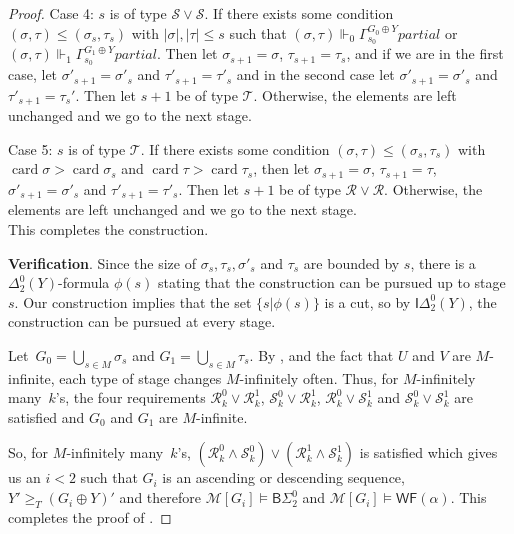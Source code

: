 \documentclass{article}
\newtheorem{theorem}{Theorem}
\numberwithin{theorem}{section}
\newcommand{\RCA}{\mathsf{RCA}}
\newcommand{\SADS}{\mathsf{SADS}}
\newcommand{\BSig}{\mathsf{B}\Sigma^0}
\newcommand{\IDel}{\mathsf{I}\Delta^0}
\newcommand{\WF}{\mathsf{WF}}
\newcommand{\R}{\mathcal{R}}
\renewcommand{\S}{\mathcal{S}}
\newcommand{\M}{\mathcal{M}}
\newcommand{\card}{\operatorname{card}}
\begin{document}
\begin{proof}
Case 4: $s$ is of type $\S \vee \S$. If there exists some condition $(\sigma,\tau) \leq (\sigma_s,\tau_s)$ with $|\sigma|,|\tau| \leq s$ such that $(\sigma,\tau) \Vdash_0\Gamma_{s_0}^{G_0 \oplus Y} partial$ or $(\sigma,\tau) \Vdash_1 \Gamma_{s_0}^{G_1 \oplus Y} partial$. Then let $\sigma_{s+1} = \sigma$, $\tau_{s+1} = \tau_s$, and if we are in the first case, let $\sigma'_{s+1} = \sigma'_s$ and $\tau'_{s+1} = \tau'_s$ and in the second case let $\sigma'_{s+1} = \sigma'_s$ and $\tau'_{s+1} = \tau_s'$. Then let $s+1$ be of type $\mathcal{T}$. Otherwise, the elements are left unchanged and we go to the next stage.

Case 5: $s$ is of type $\mathcal{T}$. If there exists some condition $(\sigma, \tau) \leq (\sigma_s, \tau_s)$ with $\card \sigma > \card \sigma_s$ and $\card \tau > \card \tau_s$, then let $\sigma_{s+1} = \sigma$, $\tau_{s+1} = \tau$, $\sigma'_{s+1} = \sigma'_s$ and $\tau'_{s+1} = \tau'_s$. Then let $s+1$ be of type $\R \vee \R$. Otherwise, the elements are left unchanged and we go to the next stage. \\ 

This completes the construction.
\bigskip

\textbf{Verification}. Since the size of $\sigma_s, \tau_s, \sigma'_s$ and $\tau_s$ are bounded by $s$, there is a $\Delta_2^0(Y)$-formula $\phi(s)$ stating that the construction can be pursued up to stage $s$. Our construction implies that the set $\{s|\phi(s)\}$ is a cut, so by $\IDel_2(Y)$, the construction can be pursued at every stage.

Let~$G_0 = \bigcup_{s \in M} \sigma_s$ and $G_1 = \bigcup_{s \in M} \tau_s$.
By , and the fact that $U$ and $V$ are $M$-infinite, each type of stage changes $M$-infinitely often. Thus, for $M$-infinitely many~$k$'s, the four requirements $\R^0_k \vee \R^1_k$, $\S^0_k \vee \R^1_k$, $\R^0_k \vee \S^1_k$ and $\S^0_k \vee \S^1_k$ are satisfied and $G_0$ and $G_1$ are $M$-infinite. 

So, for $M$-infinitely many~$k$'s, $(\mathcal{R}^0_k \wedge \S^0_k) \vee (\R^1_k \wedge \S^1_k)$ is satisfied which gives us an $i < 2$ such that $G_i$ is an ascending or descending sequence, $Y' \geq_T (G_i \oplus Y)'$ and therefore $\M[G_i] \models \BSig_2$ and $\M[G_i] \models \WF(\alpha)$. This completes the proof of .
\end{proof}

\end{document}
